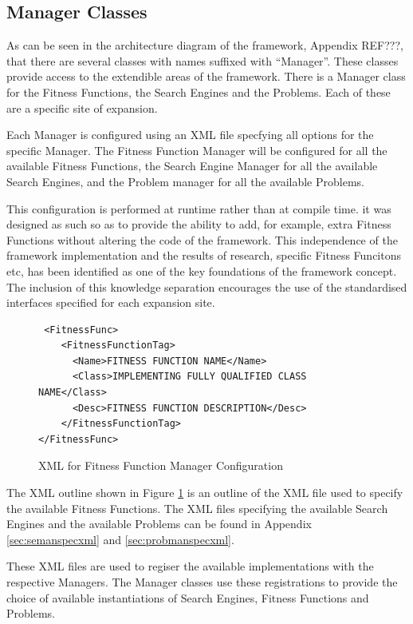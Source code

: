 \subsection{Manager Classes}
As can be seen in the architecture diagram of the framework, Appendix REF???, that there are several classes with names suffixed with ``Manager''.
These classes provide access to the extendible areas of the framework.
There is a Manager class for the Fitness Functions, the Search Engines and the Problems.
Each of these are a specific site of expansion.

Each Manager is configured using an XML file specfying all options for the specific Manager.
The Fitness Function Manager will be configured for all the available Fitness Functions, the Search Engine Manager for all the available Search Engines, and the Problem manager for all the available Problems.

This configuration is performed at runtime rather than at compile time.
it was designed as such so as to provide the ability to add, for example, extra Fitness Functions without altering the code of the framework.
This independence of the framework implementation and the results of research, specific Fitness Funcitons etc, has been identified as one of the key foundations of the framework concept.
The inclusion of this knowledge separation encourages the use of the standardised interfaces specified for each expansion site.

\lstset{language=XML}
\begin{figure}
\begin{lstlisting}
 <FitnessFunc>
	<FitnessFunctionTag>
	  <Name>FITNESS FUNCTION NAME</Name>
	  <Class>IMPLEMENTING FULLY QUALIFIED CLASS NAME</Class>
	  <Desc>FITNESS FUNCTION DESCRIPTION</Desc>
	</FitnessFunctionTag>
</FitnessFunc>
\end{lstlisting}
\caption{XML for Fitness Function Manager Configuration}
\label{code:fitfuntmanconfig}
\end{figure}

The XML outline shown in Figure \ref{code:fitfuntmanconfig} is an outline of the XML file used to specify the available Fitness Functions.
The XML files specifying the available Search Engines and the available Problems can be found in Appendix \ref{sec:semanspecxml} and \ref{sec:probmanspecxml}.

These XML files are used to regiser the available implementations with the respective Managers.
The Manager classes use these registrations to provide the choice of available instantiations of Search Engines, Fitness Functions and Problems.

